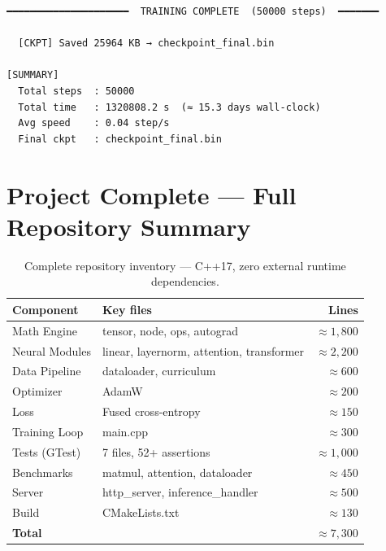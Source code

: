\documentclass[12pt, a4paper]{article}
\begin{document}
\begin{verbatim}
━━━━━━━━━━━━━━━━━━━━━  TRAINING COMPLETE  (50000 steps)  ━━━━━━━

  [CKPT] Saved 25964 KB → checkpoint_final.bin

[SUMMARY]
  Total steps  : 50000
  Total time   : 1320808.2 s  (≈ 15.3 days wall-clock)
  Avg speed    : 0.04 step/s
  Final ckpt   : checkpoint_final.bin
\end{verbatim}

\section*{Project Complete --- Full Repository Summary}

\begin{table}[!ht]
\centering
\renewcommand{\arraystretch}{1.4}
\begin{tabular}{@{} l l r @{}}
\toprule
\textbf{Component} & \textbf{Key files} & \textbf{Lines} \\
\midrule
Math Engine     & tensor, node, ops, autograd           & $\approx 1{,}800$ \\
Neural Modules  & linear, layernorm, attention, transformer & $\approx 2{,}200$ \\
Data Pipeline   & dataloader, curriculum                & $\approx 600$ \\
Optimizer       & AdamW                                 & $\approx 200$ \\
Loss            & Fused cross-entropy                   & $\approx 150$ \\
Training Loop   & main.cpp                              & $\approx 300$ \\
Tests (GTest)   & 7 files, 52+ assertions               & $\approx 1{,}000$ \\
Benchmarks      & matmul, attention, dataloader         & $\approx 450$ \\
Server          & http\_server, inference\_handler      & $\approx 500$ \\
Build           & CMakeLists.txt                        & $\approx 130$ \\
\midrule
\textbf{Total}  &                                       & $\approx 7{,}300$ \\
\bottomrule
\end{tabular}
\caption{Complete repository inventory --- C++17, zero external runtime dependencies.}
\end{table}
\end{document}

